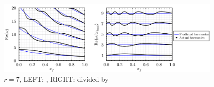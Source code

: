 



\begin{figure}[t]
\centering
\includegraphics[scale=0.35]{assets/graphs/r=7_harmonics_both.pdf}
\caption{$r = 7$, LEFT: , RIGHT: divided by }
\label{fig:flame-harmonics}
\end{figure}

